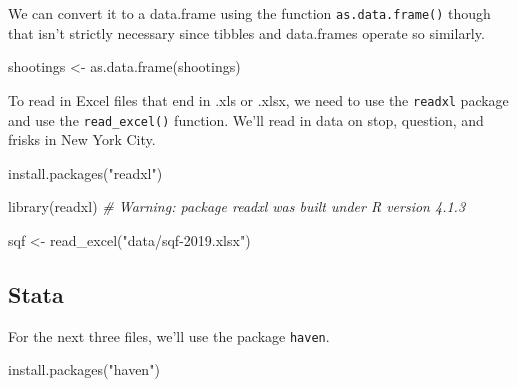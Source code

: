 \documentclass[
  a4paper,
]{krantz}
\makeatletter
\newenvironment{Shaded}{\begin{snugshade}}{\end{snugshade}}
\newcommand{\CommentTok}[1]{\textcolor[rgb]{0.37,0.37,0.37}{\textit{#1}}}
\newcommand{\FunctionTok}[1]{\textcolor[rgb]{0,0,0}{#1}}
\newcommand{\NormalTok}[1]{#1}
\newcommand{\OtherTok}[1]{\textcolor[rgb]{0.37,0.37,0.37}{#1}}
\newcommand{\StringTok}[1]{\textcolor[rgb]{0.5,0.5,0.5}{#1}}
\newenvironment{kframe}{%
\medskip{}
\setlength{\fboxsep}{.8em}
 \def\at@end@of@kframe{}%
 \ifinner\ifhmode%
  \def\at@end@of@kframe{\end{minipage}}%
  \begin{minipage}{\columnwidth}%
 \fi\fi%
 \def\FrameCommand##1{\hskip\@totalleftmargin \hskip-\fboxsep
 \colorbox{shadecolor}{##1}\hskip-\fboxsep
     \hskip-\linewidth \hskip-\@totalleftmargin \hskip\columnwidth}%
 \MakeFramed {\advance\hsize-\width
   \@totalleftmargin\z@ \linewidth\hsize
   \@setminipage}}%
 {\par\unskip\endMakeFramed%
 \at@end@of@kframe}
\renewenvironment{Shaded}{\begin{kframe}}{\end{kframe}}
\makeatother
\begin{document}
We can convert it to a data.frame using the function
\texttt{as.data.frame()} though that isn't strictly
necessary since tibbles and data.frames operate so
similarly.

\begin{Shaded}
\begin{Highlighting}[]
\NormalTok{shootings }\OtherTok{\textless{}{-}} \FunctionTok{as.data.frame}\NormalTok{(shootings)}
\end{Highlighting}
\end{Shaded}

To read in Excel files that end in .xls or .xlsx, we need to
use the \texttt{readxl} package and use the
\texttt{read\_excel()} function. We'll read in data on stop,
question, and frisks in New York City.

\begin{Shaded}
\begin{Highlighting}[]
\FunctionTok{install.packages}\NormalTok{(}\StringTok{"readxl"}\NormalTok{)}
\end{Highlighting}
\end{Shaded}

\begin{Shaded}
\begin{Highlighting}[]
\FunctionTok{library}\NormalTok{(readxl)}
\CommentTok{\# Warning: package \textquotesingle{}readxl\textquotesingle{} was built under R version 4.1.3}
\end{Highlighting}
\end{Shaded}

\begin{Shaded}
\begin{Highlighting}[]
\NormalTok{sqf }\OtherTok{\textless{}{-}} \FunctionTok{read\_excel}\NormalTok{(}\StringTok{"data/sqf{-}2019.xlsx"}\NormalTok{)}
\end{Highlighting}
\end{Shaded}

\hypertarget{stata}{%
\subsection{Stata}\label{stata}}

For the next three files, we'll use the package
\texttt{haven}.

\begin{Shaded}
\begin{Highlighting}[]
\FunctionTok{install.packages}\NormalTok{(}\StringTok{"haven"}\NormalTok{)}
\end{Highlighting}
\end{Shaded}
\end{document}
